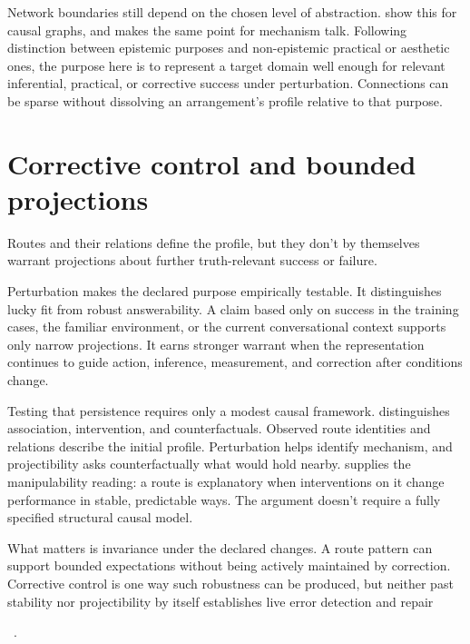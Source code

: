 \documentclass[12pt]{article}
\newif\ifttpanonymous
\newcommand{\transitionpagehead}[1]{%
  \fancypagestyle{ttptransition}{%
    \fancyhf{}%
    \fancyhead[L]{\small\scshape #1}%
    \fancyhead[R]{\small\thepage}%
    \renewcommand{\headrulewidth}{0pt}%
  }%
  \thispagestyle{ttptransition}%
}
\begin{document}
Network boundaries still depend on the chosen level of abstraction.
\textcite{onishi_serpico_2022} show this for causal graphs, and \textcite{craver_2009} makes
the same point for mechanism talk. Following  distinction between
epistemic purposes and non-epistemic practical or aesthetic ones, the purpose here is to
represent a target domain well enough for relevant inferential, practical, or corrective
success under perturbation. Connections can be sparse without dissolving an arrangement's
profile relative to that purpose.

\transitionpagehead{3\quad Routes and profiles}
\section{Corrective control and bounded projections}\label{sec:projectibility}

Routes and their relations define the profile, but they don't by themselves warrant
projections about further truth-relevant success or failure.

Perturbation makes the declared purpose empirically testable. It distinguishes lucky fit from
robust answerability. A claim based only on success in the training cases, the familiar
environment, or the current conversational context supports only narrow projections. It earns stronger
warrant when the representation continues to guide action, inference, measurement, and
correction after conditions change.

Testing that persistence requires only a modest causal framework.
\textcite{pearl2009,pearl2010foundations}
distinguishes association, intervention, and counterfactuals. Observed route identities and
relations describe the initial profile. Perturbation helps identify mechanism, and projectibility
asks counterfactually what would hold nearby. \textcite{woodward2003MakingThingsHappen,woodward2001}
supplies the manipulability reading: a route is explanatory when interventions on it
change performance in stable, predictable ways. The argument doesn't require a fully
specified structural causal model.

What matters is invariance under the declared changes. A route
pattern can support bounded expectations without being actively maintained by correction.
Corrective control is one way such robustness can be produced, but neither past stability
nor projectibility by itself establishes live error detection and repair%
\ifttpanonymous
.
\else
~\citep{reynolds2026projectibilityHistory}.
\fi
\end{document}
